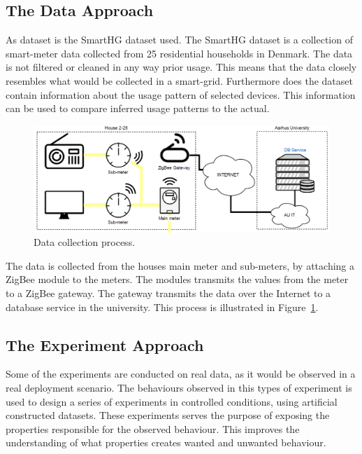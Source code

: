 \subsection{The Data Approach}
As dataset is the SmartHG dataset used. The SmartHG dataset is a collection of smart-meter data collected from 25 residential households in Denmark. The data is not filtered or cleaned in any way prior usage. This means that the data closely resembles what would be collected in a smart-grid. Furthermore does the dataset contain information about the usage pattern of selected devices. This information can be used to compare inferred usage patterns to the actual. 

\begin{figure}[H]
\centering
\includegraphics[width=1\textwidth]{billeder/DataCollection.png}
\caption{Data collection process.}
\label{fig:DCP}
\end{figure}
The data is collected from the houses main meter and sub-meters, by attaching a ZigBee module to the meters. The modules transmits the values from the meter to a ZigBee gateway. The gateway transmits the data over the Internet to a database service in the university. This process is illustrated in Figure~\ref{fig:DCP}.

\subsection{The Experiment Approach}
Some of the experiments are conducted on real data, as it would be observed in a real deployment scenario. The behaviours observed in this types of experiment is used to design a series of experiments in controlled conditions, using artificial constructed datasets. These experiments serves the purpose of exposing the properties responsible for the observed behaviour. This improves the understanding of what properties creates wanted and unwanted behaviour.